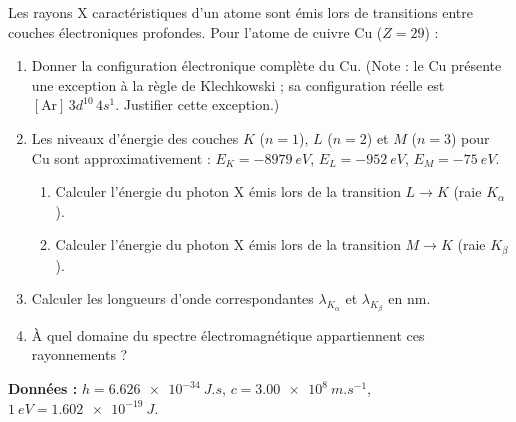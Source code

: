 \documentclass[12pt,a4paper]{article}
\begin{document}
\begin{boiteexercice}
Les rayons X caractéristiques d'un atome sont émis lors de transitions entre couches électroniques profondes. Pour l'atome de cuivre Cu ($Z = 29$) :

\begin{enumerate}
  \item Donner la configuration électronique complète du Cu. (Note : le Cu présente une exception à la règle de Klechkowski ; sa configuration réelle est $[\text{Ar}]\,3d^{10}\,4s^1$. Justifier cette exception.)
  \item Les niveaux d'énergie des couches $K$ ($n=1$), $L$ ($n=2$) et $M$ ($n=3$) pour Cu sont approximativement :
  $E_K = -\qty{8979}{eV}$, $E_L = -\qty{952}{eV}$, $E_M = -\qty{75}{eV}$.
  \begin{enumerate}[label=(\alph*)]
    \item Calculer l'énergie du photon X émis lors de la transition $L \to K$ (raie $K_\alpha$).
    \item Calculer l'énergie du photon X émis lors de la transition $M \to K$ (raie $K_\beta$).
  \end{enumerate}
  \item Calculer les longueurs d'onde correspondantes $\lambda_{K_\alpha}$ et $\lambda_{K_\beta}$ en nm.
  \item À quel domaine du spectre électromagnétique appartiennent ces rayonnements ?
\end{enumerate}

\textbf{Données :} $h = \qty{6.626e-34}{J.s}$, $c = \qty{3.00e8}{m.s^{-1}}$, $\qty{1}{eV} = \qty{1.602e-19}{J}$.
\end{boiteexercice}
\end{document}
